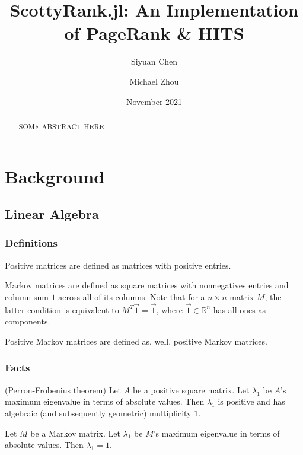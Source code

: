 \documentclass[12pt, titlepage, twoside]{amsart}
\newcommand{\R}{\ensuremath{\mathbb R}}
\begin{document}
\title[ScottyRank.jl]{ScottyRank.jl: An Implementation of PageRank \& HITS}

\author{Siyuan Chen}
\author{Michael Zhou}
\date{November 2021}

\begin{abstract}
  SOME ABSTRACT HERE
\end{abstract}

\maketitle

\tableofcontents

\section{Background}

\subsection{Linear Algebra}

\subsubsection{Definitions}

Positive matrices are defined as matrices with positive entries.

Markov matrices are defined as square matrices with nonnegatives entries and column sum $1$ across all of its columns.
Note that for a $n\times n$ matrix $M$, the latter condition is equivalent to $M^T\vec{1} = \vec{1}$,
where $\vec{1}\in\R^n$ has all ones as components.

Positive Markov matrices are defined as, well, positive Markov matrices.

\subsubsection{Facts}

(Perron-Frobenius theorem)
Let $A$ be a positive square matrix.
Let $\lambda_1$ be $A$'s maximum eigenvalue in terms of absolute values.
Then $\lambda_1$ is positive and has algebraic (and subsequently geometric) multiplicity $1$.

Let $M$ be a Markov matrix.
Let $\lambda_1$ be $M$'s maximum eigenvalue in terms of absolute values.
Then $\lambda_1 = 1$.
\end{document}
